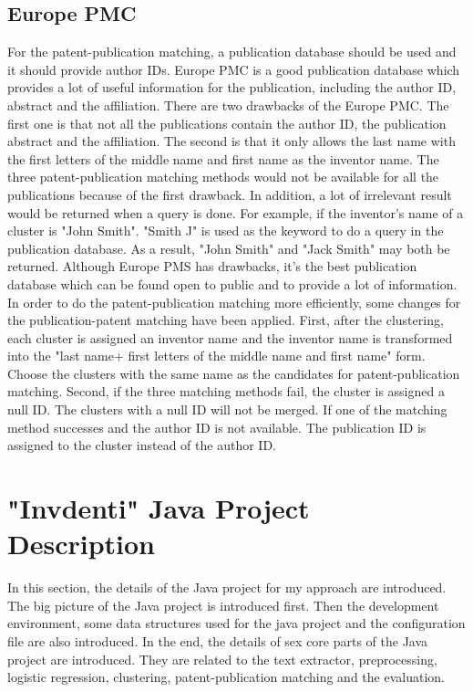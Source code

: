 \subsection{Europe PMC}
For the patent-publication matching, a publication database should be used and it should provide author IDs. Europe PMC is a good publication database which provides a lot of useful information for the publication, including the author ID, abstract and the affiliation. There are two drawbacks of the Europe PMC. The first one is that not all the publications contain the author ID, the publication abstract and the affiliation. The second  is that it only allows the last name with the first letters of the middle name and first name as the inventor name. The three patent-publication matching methods would not be available for all the publications because of the first drawback. In addition, a lot of irrelevant result would be returned when a query is done. For example, if the inventor's name of a cluster is "John Smith". "Smith J"  is used as the keyword to do a query in the publication database. As a result, "John Smith" and "Jack Smith" may both be returned. Although Europe PMS has drawbacks, it's the best publication database which can be found open to public and to provide a lot of information. In order to do the patent-publication matching more efficiently, some changes for the publication-patent matching have been applied. First, after the clustering, each cluster is assigned an inventor name and the inventor name is transformed into the "last name+ first letters of the middle name and first name" form. Choose the clusters with the same name as the candidates for patent-publication matching. Second, if the three matching methods fail, the cluster is assigned a null ID. The clusters with a null ID will not be merged. If one of the matching method successes and the author ID is not available. The publication ID is assigned to the cluster instead of the author ID.  

\section{"Invdenti" Java Project Description}
In this section, the details of the Java project for my approach are introduced. The big picture of the Java project is introduced first. Then the development environment, some data structures used for the java project and the configuration file are also introduced. In the end, the details of sex core parts of the Java project are introduced. They are related to the text extractor, preprocessing, logistic regression, clustering, patent-publication matching and the evaluation.

